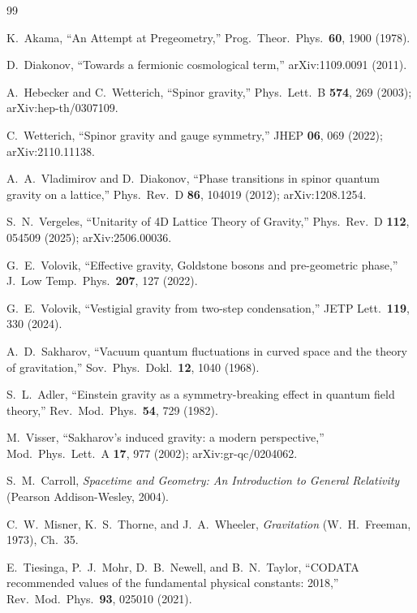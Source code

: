 \documentclass[aps,prd,twocolumn,showpacs,superscriptaddress,nofootinbib]{revtex4-2}
\begin{document}

\begin{thebibliography}{99}

 K.~Akama, ``An Attempt at Pregeometry,''
Prog.\ Theor.\ Phys.\ \textbf{60}, 1900 (1978).

 D.~Diakonov, ``Towards a fermionic cosmological
term,'' arXiv:1109.0091 (2011).

 A.~Hebecker and C.~Wetterich,
``Spinor gravity,'' Phys.\ Lett.\ B \textbf{574}, 269 (2003);
arXiv:hep-th/0307109.

 C.~Wetterich, ``Spinor gravity and gauge symmetry,''
JHEP \textbf{06}, 069 (2022); arXiv:2110.11138.

 A.~A.~Vladimirov and D.~Diakonov,
``Phase transitions in spinor quantum gravity on a lattice,''
Phys.\ Rev.\ D \textbf{86}, 104019 (2012); arXiv:1208.1254.

 S.~N.~Vergeles, ``Unitarity of 4D Lattice
Theory of Gravity,'' Phys.\ Rev.\ D \textbf{112}, 054509 (2025);
arXiv:2506.00036.

 G.~E.~Volovik, ``Effective gravity, Goldstone
bosons and pre-geometric phase,'' J.\ Low Temp.\ Phys.\ \textbf{207},
127 (2022).

 G.~E.~Volovik, ``Vestigial gravity from
two-step condensation,'' JETP Lett.\ \textbf{119}, 330 (2024).

 A.~D.~Sakharov, ``Vacuum quantum fluctuations in
curved space and the theory of gravitation,'' Sov.\ Phys.\ Dokl.\
\textbf{12}, 1040 (1968).

 S.~L.~Adler, ``Einstein gravity as a symmetry-breaking
effect in quantum field theory,'' Rev.\ Mod.\ Phys.\ \textbf{54}, 729
(1982).

 M.~Visser, ``Sakharov's induced gravity: a modern
perspective,'' Mod.\ Phys.\ Lett.\ A \textbf{17}, 977 (2002);
arXiv:gr-qc/0204062.

 S.~M.~Carroll, \textit{Spacetime and Geometry: An
Introduction to General Relativity} (Pearson Addison-Wesley, 2004).

 C.~W.~Misner, K.~S.~Thorne, and J.~A.~Wheeler,
\textit{Gravitation} (W.\ H.\ Freeman, 1973), Ch.\ 35.

 E.~Tiesinga, P.~J.~Mohr, D.~B.~Newell,
and B.~N.~Taylor, ``CODATA recommended values of the fundamental
physical constants: 2018,'' Rev.\ Mod.\ Phys.\ \textbf{93}, 025010
(2021).

\end{thebibliography}
\end{document}
